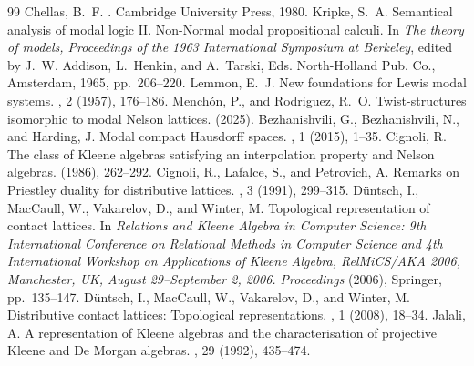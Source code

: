 \documentclass[10pt,a4paper]{amsart}
\begin{document}
\begin{thebibliography}{99}
 {\sc Chellas, B.~F.} . \newblock Cambridge University Press, 1980.
 {\sc Kripke, S.~A.} \newblock Semantical analysis of modal logic {II}. {Non-Normal} modal propositional calculi. \newblock In {\em The theory of models, Proceedings of the 1963 International Symposium at Berkeley}, edited by J.~W. Addison, L.~Henkin, and A.~Tarski, Eds. North-Holland Pub. Co., Amsterdam, 1965, pp.~206--220.
 {\sc Lemmon, E.~J.} \newblock New foundations for {L}ewis modal systems. , 2 (1957), 176--186.
 {\sc Menchón, P., and Rodriguez, R.~O.} \newblock Twist-structures isomorphic to modal {N}elson lattices.  (2025).
 {\sc Bezhanishvili, G., Bezhanishvili, N., and Harding, J.} \newblock Modal compact {H}ausdorff spaces. , 1 (2015), 1--35.
 {\sc Cignoli, R.} \newblock The class of {K}leene algebras satisfying an interpolation property and {N}elson algebras.  (1986), 262--292.
 {\sc Cignoli, R., Lafalce, S., and Petrovich, A.} \newblock Remarks on {P}riestley duality for distributive lattices. , 3 (1991), 299--315.
 {\sc D{\"u}ntsch, I., MacCaull, W., Vakarelov, D., and Winter, M.} \newblock Topological representation of contact lattices. \newblock In {\em Relations and Kleene Algebra in Computer Science: 9th International Conference on Relational Methods in Computer Science and 4th International Workshop on Applications of Kleene Algebra, RelMiCS/AKA 2006, Manchester, UK, August 29--September 2, 2006. Proceedings \/} (2006), Springer, pp.~135--147.
 {\sc D{\"u}ntsch, I., MacCaull, W., Vakarelov, D., and Winter, M.} \newblock Distributive contact lattices: {T}opological representations. , 1 (2008), 18--34.
 {\sc Jalali, A.} \newblock A representation of {K}leene algebras and the characterisation of projective {K}leene and {D}e {M}organ algebras. , 29 (1992), 435--474.

\end{thebibliography}
\end{document}
